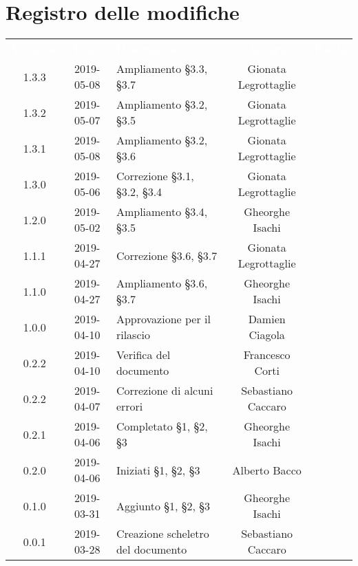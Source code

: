 \section*{Registro delle modifiche}
{
	\renewcommand{\arraystretch}{1.5}
	\centering
	\begin{longtable}{ c c C{6cm} c c }
		\textcolor{white}{\textbf{Versione}} & \textcolor{white}{\textbf{Data}} & \textcolor{white}{\textbf{Descrizione}} & \textcolor{white}{\textbf{Autore}} & \textcolor{white}{\textbf{Ruolo}}\\

		1.3.3 & 2019-05-08 & Ampliamento \S3.3, \S3.7 & Gionata Legrottaglie & \reda{} \\
		
		1.3.2 & 2019-05-07 & Ampliamento \S3.2, \S3.5 & Gionata Legrottaglie & \reda{} \\
		
		1.3.1 & 2019-05-08 & Ampliamento \S3.2, \S3.6 & Gionata Legrottaglie & \reda{} \\
		
		1.3.0 & 2019-05-06 & Correzione \S3.1, \S3.2, \S3.4 & Gionata Legrottaglie & \reda{} \\
				
		1.2.0 & 2019-05-02 & Ampliamento \S3.4, \S3.5 & Gheorghe Isachi & \reda{} \\	
		
		1.1.1 & 2019-04-27 & Correzione \S3.6, \S3.7 & Gionata Legrottaglie & \reda{} \\	
		
		1.1.0 & 2019-04-27 & Ampliamento \S3.6, \S3.7 & Gheorghe Isachi & \reda{} \\
		
		1.0.0 & 2019-04-10 & Approvazione per il rilascio & Damien Ciagola & \RdP{} \\ 
			
		0.2.2 & 2019-04-10 & Verifica del documento & Francesco Corti & \ver{} \\ 
		
		0.2.2 & 2019-04-07 & Correzione di alcuni errori & Sebastiano Caccaro & \reda{} \\ 

		0.2.1 & 2019-04-06 & Completato \S1, \S2, \S3 & Gheorghe Isachi & \reda{} \\
		
		0.2.0 & 2019-04-06 & Iniziati \S1, \S2, \S3 & Alberto Bacco & \reda{} \\
		
		0.1.0 & 2019-03-31 & Aggiunto \S1, \S2, \S3 & Gheorghe Isachi & \reda{} \\
		
		0.0.1 & 2019-03-28 & Creazione scheletro del documento & Sebastiano Caccaro & \reda{}
		
	\end{longtable}

}